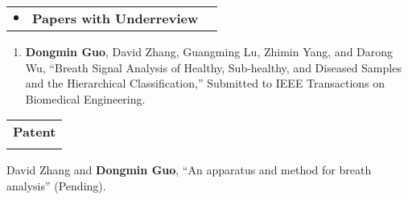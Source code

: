 \documentclass[letterpaper,11pt]{report}
\makeatletter
\newcommand{\resheading}[1]{
\vspace{6pt}\begin{tabular*}{6.71in}{l@{\extracolsep{\fill}}}
        \large {\textbf{#1}} \\
        \Xhline{1.2pt}
\end{tabular*}\vspace{-2pt}}
\newcommand{\ressubheadingtwo}[1]{
\begin{tabular*}{6.9in}{ll@{\extracolsep{\fill}}r}
        \hspace{0.15in} $\bullet$ \hspace{0.05in} & \textbf{#1}\\
\end{tabular*}\vspace{-4pt}}
\makeatother
\begin{document}
\begin{description}
\item \ressubheadingtwo{\bf{Papers with Underreview}}
\begin{enumerate}
        \item {\bf{Dongmin Guo}}, David Zhang, Guangming Lu, Zhimin Yang, and Darong Wu, ``Breath Signal Analysis of Healthy, Sub-healthy, and Diseased Samples and the Hierarchical Classification,'' Submitted to IEEE Transactions on Biomedical Engineering.
    \end{enumerate}
\end{description}

\resheading{Patent}
\begin{description}
\item \hspace{0.15in} {David Zhang and {\bf{Dongmin Guo}}, ``An apparatus and method for breath analysis'' (Pending)}.
\end{description}
\end{document}
